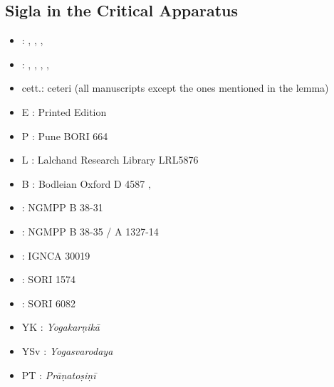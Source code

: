 \subsection{Sigla in the Critical Apparatus}

\begin{itemize}
\item \alpha : , ,  , 
\item \beta : , ,  , , 
\item cett.: ceteri (all manuscripts except the ones mentioned in the lemma)
\item E : Printed Edition
\item P : Pune BORI 664
\item L : Lalchand Research Library LRL5876
\item B : Bodleian Oxford D 4587
‚\item \None : NGMPP B 38-31
\item \Ntwo : NGMPP B 38-35 / A 1327-14
\item \Done : IGNCA 30019
\item \Uone : SORI 1574
\item \Utwo : SORI 6082
\item YK : \emph{Yogakarṇikā}
\item YSv : \emph{Yogasvarodaya}
\item PT : \emph{Prāṇatoṣiṇī}
\end{itemize}

